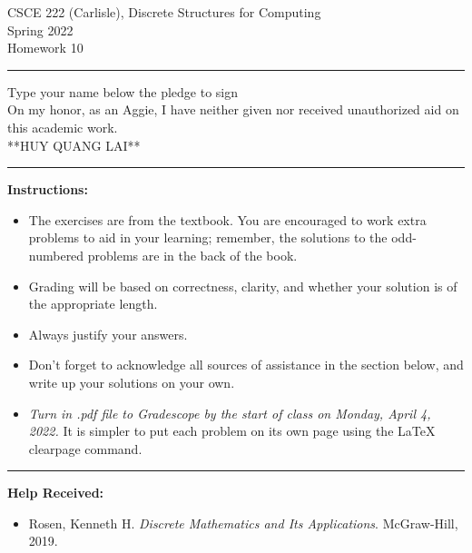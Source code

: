 \documentclass[12pt]{article}  %
\begin{document}
\begin{center}         %
{\large                %
CSCE 222 (Carlisle), Discrete Structures for Computing \\  %
Spring 2022 \\
Homework 10}
\end{center}
\rule{6in}{.1pt}       %
\begin{center}
{\large
Type your name below the pledge to sign\\
On my honor, as an Aggie, I have neither given nor received unauthorized aid on this academic work.\\
**HUY QUANG LAI**}
\end{center}


\rule{6in}{.1pt}       %
                    
\noindent              %
{\bf Instructions:}    %

\begin{itemize}        %
\item The exercises are from the textbook.  You are encouraged to work
      extra problems to aid in your learning; remember, the solutions to 
      the odd-numbered problems are in the back of the book.
\item Grading will be based on correctness, clarity, and whether your
      solution is of the appropriate length.
\item Always justify your answers.
\item Don't forget to acknowledge all sources of assistance in the section below, and write up your solutions on your own.
\item {\em Turn in .pdf file to Gradescope by the start of class on Monday, April 4, 2022.}  It is simpler to put each problem on its own page using the LaTeX clearpage command.
\end{itemize}


\rule{6in}{.1pt}       %

{\bf Help Received:}    %
\begin{itemize}
\item Rosen, Kenneth H. \textit{Discrete Mathematics and Its Applications}. McGraw-Hill, 2019.
\end{itemize}
\end{document}
